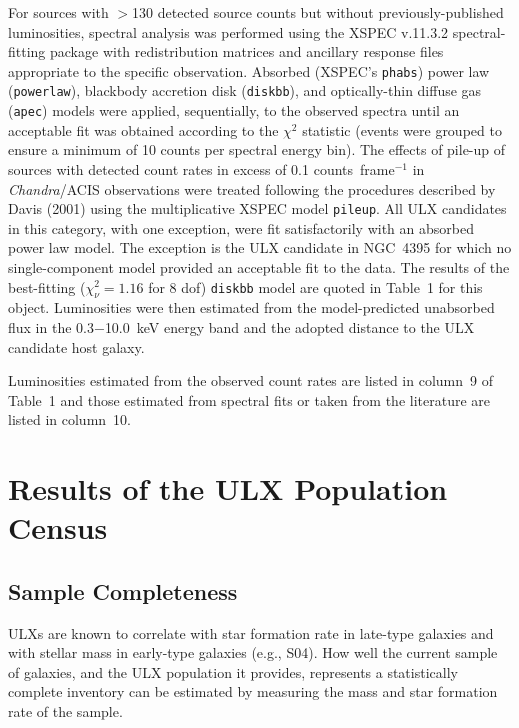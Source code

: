 \documentclass{article}
\newcommand{\cxo}{{\sl Chandra}}
\begin{document}
For sources with $>$130 detected source counts
 but without previously-published luminosities,
  spectral analysis was performed using the XSPEC v.11.3.2 
 spectral-fitting package with 
 redistribution matrices and ancillary response files appropriate
 to the specific observation.
Absorbed (XSPEC's {\tt phabs}) power law ({\tt powerlaw}), 
 blackbody accretion disk ({\tt diskbb}), 
 and optically-thin diffuse gas ({\tt apec}) models
 were applied, sequentially, to the observed spectra 
 until an acceptable fit was obtained
 according to the $\chi^2$ statistic
(events were grouped to ensure a minimum of 10 counts per spectral energy bin).
The effects of pile-up of sources with detected count
 rates in excess of 0.1 counts~frame$^{-1}$ in \cxo/ACIS observations 
 were treated following the procedures
  described by Davis (2001) using the multiplicative XSPEC model {\tt pileup}.
All ULX candidates in this category, with one exception,
 were fit satisfactorily with an
 absorbed power law model.
The exception is the ULX candidate in NGC~4395 for which no 
single-component model
 provided an acceptable fit to the data. The results of the 
 best-fitting ($\chi^2_{\nu}=1.16$ for 8 dof) {\tt diskbb} model
 are quoted in Table~1 for this object.
Luminosities were then estimated from the model-predicted unabsorbed 
 flux in the 0.3$-$10.0~keV energy band and the adopted distance 
 to the ULX candidate host galaxy.

Luminosities estimated from the observed count rates are listed
 in column~9 of Table~1 and those estimated from spectral fits or taken from
 the literature are listed in column~10.

\section{Results of the ULX Population Census} \label{s:results}

\subsection{Sample Completeness}

ULXs are known to correlate with star formation rate in late-type galaxies
 and with stellar mass in early-type galaxies (e.g., S04).
How well the current sample of galaxies, and the ULX population it
 provides, represents a statistically complete inventory 
can be estimated by measuring the mass and star formation rate of the sample.
\end{document}
